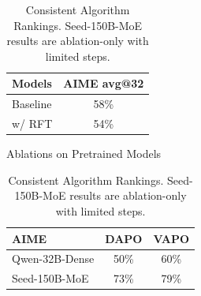 \begin{table}[htbp]
  \centering
  \begin{minipage}[t]{0.45\linewidth}
    \centering
    \begin{tabular}{l|c}
      \toprule
      \textbf{Models} & AIME avg@32 \\
      \midrule
      Baseline   & 58\% \\
      w/ RFT     & 54\% \\
      \bottomrule
    \end{tabular}
    \caption{Ablations on Pretrained Models}
    \label{tab:ablation-pretrain}
  \end{minipage}
  \hfill
  \begin{minipage}[t]{0.45\linewidth}
    \centering
    \begin{tabular}{l|cc}
      \toprule
      \textbf{AIME} & DAPO & VAPO \\
      \midrule
      Qwen-32B-Dense & 50\% & 60\% \\
      Seed-150B-MoE & 73\% & 79\% \\
      \bottomrule
    \end{tabular}
    \caption{Consistent Algorithm Rankings. Seed-150B-MoE results are ablation-only with limited steps.}
    \label{tab:ranking}
  \end{minipage}
  \label{tab:combined}
\end{table}


